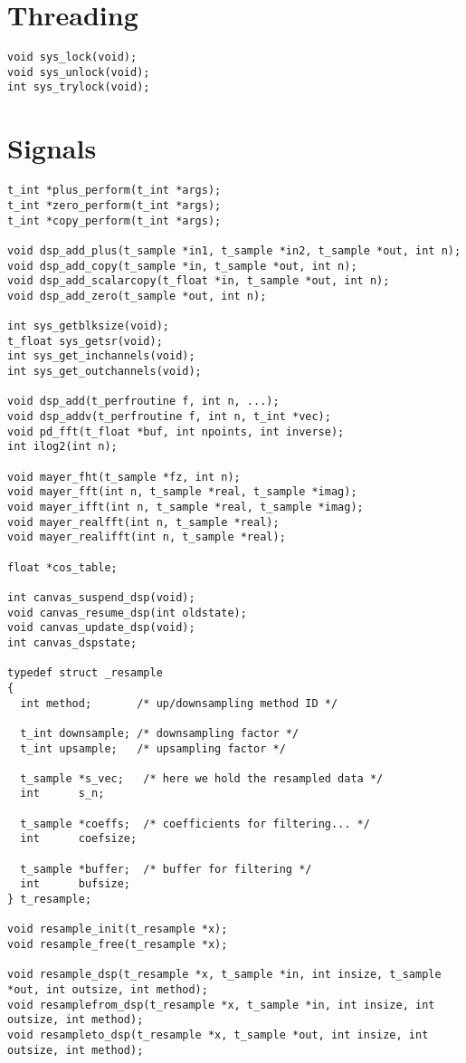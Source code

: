 \section{Threading}
\begin{lstlisting}
void sys_lock(void);
void sys_unlock(void);
int sys_trylock(void);
\end{lstlisting}

\section{Signals}
\begin{lstlisting}
t_int *plus_perform(t_int *args);
t_int *zero_perform(t_int *args);
t_int *copy_perform(t_int *args);

void dsp_add_plus(t_sample *in1, t_sample *in2, t_sample *out, int n);
void dsp_add_copy(t_sample *in, t_sample *out, int n);
void dsp_add_scalarcopy(t_float *in, t_sample *out, int n);
void dsp_add_zero(t_sample *out, int n);

int sys_getblksize(void);
t_float sys_getsr(void);
int sys_get_inchannels(void);
int sys_get_outchannels(void);

void dsp_add(t_perfroutine f, int n, ...);
void dsp_addv(t_perfroutine f, int n, t_int *vec);
void pd_fft(t_float *buf, int npoints, int inverse);
int ilog2(int n);

void mayer_fht(t_sample *fz, int n);
void mayer_fft(int n, t_sample *real, t_sample *imag);
void mayer_ifft(int n, t_sample *real, t_sample *imag);
void mayer_realfft(int n, t_sample *real);
void mayer_realifft(int n, t_sample *real);

float *cos_table;

int canvas_suspend_dsp(void);
void canvas_resume_dsp(int oldstate);
void canvas_update_dsp(void);
int canvas_dspstate;

typedef struct _resample
{
  int method;       /* up/downsampling method ID */

  t_int downsample; /* downsampling factor */
  t_int upsample;   /* upsampling factor */

  t_sample *s_vec;   /* here we hold the resampled data */
  int      s_n;

  t_sample *coeffs;  /* coefficients for filtering... */
  int      coefsize;

  t_sample *buffer;  /* buffer for filtering */
  int      bufsize;
} t_resample;

void resample_init(t_resample *x);
void resample_free(t_resample *x);

void resample_dsp(t_resample *x, t_sample *in, int insize, t_sample *out, int outsize, int method);
void resamplefrom_dsp(t_resample *x, t_sample *in, int insize, int outsize, int method);
void resampleto_dsp(t_resample *x, t_sample *out, int insize, int outsize, int method);
\end{lstlisting}

